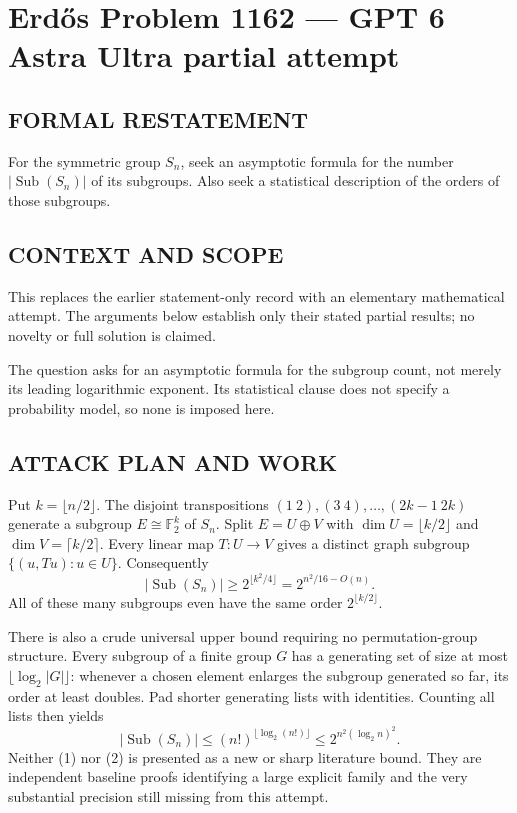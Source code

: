 \section*{Erd\H{o}s Problem 1162 --- GPT 6 Astra Ultra partial attempt}


\subsection*{FORMAL RESTATEMENT}
For the symmetric group $S_n$, seek an asymptotic formula for the number $|\operatorname{Sub}(S_n)|$ of its subgroups. Also seek a statistical description of the orders of those subgroups.

\subsection*{CONTEXT AND SCOPE}
This replaces the earlier statement-only record with an elementary mathematical attempt. The arguments below establish only their stated partial results; no novelty or full solution is claimed.

The question asks for an asymptotic formula for the subgroup count, not merely its leading logarithmic exponent. Its statistical clause does not specify a probability model, so none is imposed here.

\subsection*{ATTACK PLAN AND WORK}
Put $k=\lfloor n/2\rfloor$. The disjoint transpositions
$(1\ 2),(3\ 4),\ldots,(2k-1\ 2k)$ generate a subgroup
$E\cong\mathbb F_2^k$ of $S_n$. Split $E=U\oplus V$ with
$\dim U=\lfloor k/2\rfloor$ and $\dim V=\lceil k/2\rceil$.
Every linear map $T:U\to V$ gives a distinct graph subgroup
$\{(u,Tu):u\in U\}$. Consequently
\[|\operatorname{Sub}(S_n)|\ge2^{\lfloor k^2/4\rfloor}
=2^{n^2/16-O(n)}.\tag{1}\]
All of these many subgroups even have the same order $2^{\lfloor k/2\rfloor}$.

There is also a crude universal upper bound requiring no permutation-group
structure. Every subgroup of a finite group $G$ has a generating set of size
at most $\lfloor\log_2|G|\rfloor$: whenever a chosen element enlarges the subgroup
generated so far, its order at least doubles. Pad shorter generating lists with
identities. Counting all lists then yields
\[|\operatorname{Sub}(S_n)|\le(n!)^{\lfloor\log_2(n!)\rfloor}
\le2^{n^2(\log_2 n)^2}.\tag{2}\]
Neither (1) nor (2) is presented as a new or sharp literature bound. They are
independent baseline proofs identifying a large explicit family and the very
substantial precision still missing from this attempt.

